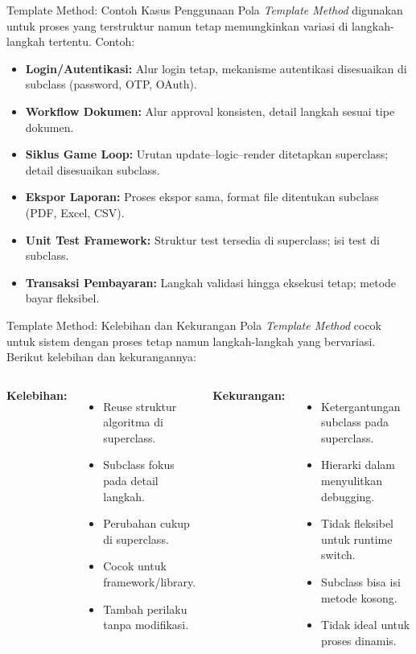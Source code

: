\documentclass[aspectratio=169, table]{beamer}
\begin{document}
\begin{frame}{Template Method: Contoh Kasus Penggunaan}
	\vspace{10pt}
	Pola \textit{Template Method} digunakan untuk proses yang terstruktur namun tetap memungkinkan variasi di langkah-langkah tertentu. Contoh:
	
	\vspace{2pt}
	\begin{itemize}
		\item \textbf{Login/Autentikasi:} Alur login tetap, mekanisme autentikasi disesuaikan di subclass (password, OTP, OAuth).
		\item \textbf{Workflow Dokumen:} Alur approval konsisten, detail langkah sesuai tipe dokumen.
		\item \textbf{Siklus Game Loop:} Urutan update–logic–render ditetapkan superclass; detail disesuaikan subclass.
		\item \textbf{Ekspor Laporan:} Proses ekspor sama, format file ditentukan subclass (PDF, Excel, CSV).
		\item \textbf{Unit Test Framework:} Struktur test tersedia di superclass; isi test di subclass.
		\item \textbf{Transaksi Pembayaran:} Langkah validasi hingga eksekusi tetap; metode bayar fleksibel.
	\end{itemize}
\end{frame}


\begin{frame}{Template Method: Kelebihan dan Kekurangan}
	\vspace{10pt}
	Pola \textit{Template Method} cocok untuk sistem dengan proses tetap namun langkah-langkah yang bervariasi. Berikut kelebihan dan kekurangannya:
	
	\vspace{6pt}
	\begin{columns}[T]
		\textbf{Kelebihan:}
		\begin{itemize}
			\item Reuse struktur algoritma di superclass.
			\item Subclass fokus pada detail langkah.
			\item Perubahan cukup di superclass.
			\item Cocok untuk framework/library.
			\item Tambah perilaku tanpa modifikasi.
		\end{itemize}
		
		\textbf{Kekurangan:}
		\begin{itemize}
			\item Ketergantungan subclass pada superclass.
			\item Hierarki dalam menyulitkan debugging.
			\item Tidak fleksibel untuk runtime switch.
			\item Subclass bisa isi metode kosong.
			\item Tidak ideal untuk proses dinamis.
		\end{itemize}
	\end{columns}
\end{frame}
\end{document}
